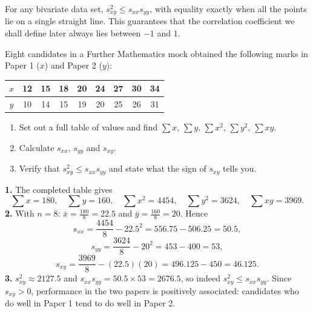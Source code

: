 \documentclass[11pt]{article}
\begin{document}
\begin{propriete}
For any bivariate data set, $s_{xy}^2\le s_{xx}s_{yy}$, with equality exactly when all the points lie on a single straight line. This guarantees that the correlation coefficient we shall define later always lies between $-1$ and $1$.
\end{propriete}

\begin{exercice}[Practice]
Eight candidates in a Further Mathematics mock obtained the following marks in Paper 1 ($x$) and Paper 2 ($y$):
\begin{center}
\begin{tabular}{|c|cccccccc|}
\hline
\rowcolor{popblueL} $x$ & 12 & 15 & 18 & 20 & 24 & 27 & 30 & 34 \\
\hline
\rowcolor{popblueL} $y$ & 10 & 14 & 15 & 19 & 20 & 25 & 26 & 31 \\
\hline
\end{tabular}
\end{center}
\begin{enumerate}
\item Set out a full table of values and find $\sum x$, $\sum y$, $\sum x^2$, $\sum y^2$, $\sum xy$.
\item Calculate $s_{xx}$, $s_{yy}$ and $s_{xy}$.
\item Verify that $s_{xy}^2\le s_{xx}s_{yy}$ and state what the sign of $s_{xy}$ tells you.
\end{enumerate}
\end{exercice}

\begin{corrige}[Exercise 1]
\textbf{1.} The completed table gives
\[ \sum x=180,\quad \sum y=160,\quad \sum x^2=4454,\quad \sum y^2=3624,\quad \sum xy=3969. \]
\textbf{2.} With $n=8$: $\bar{x}=\tfrac{180}{8}=22.5$ and $\bar{y}=\tfrac{160}{8}=20$. Hence
\[ s_{xx}=\frac{4454}{8}-22.5^2=556.75-506.25=50.5, \]
\[ s_{yy}=\frac{3624}{8}-20^2=453-400=53, \]
\[ s_{xy}=\frac{3969}{8}-(22.5)(20)=496.125-450=46.125. \]
\textbf{3.} $s_{xy}^2\approx 2127.5$ and $s_{xx}s_{yy}=50.5\times 53=2676.5$, so indeed $s_{xy}^2\le s_{xx}s_{yy}$. Since $s_{xy}>0$, performance in the two papers is positively associated: candidates who do well in Paper 1 tend to do well in Paper 2.
\end{corrige}
\end{document}
